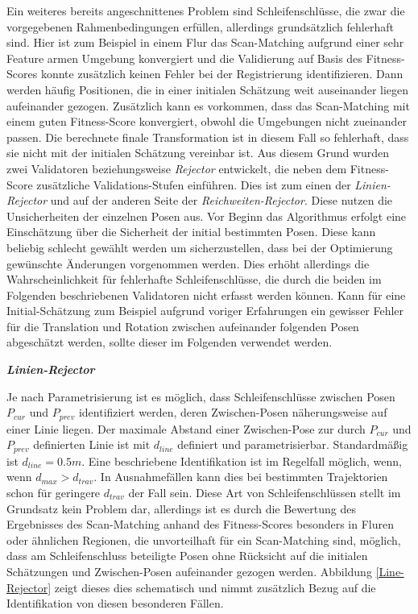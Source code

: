 Ein weiteres bereits angeschnittenes Problem sind Schleifenschlüsse, die zwar die vorgegebenen Rahmenbedingungen erfüllen, allerdings grundsätzlich fehlerhaft sind. Hier ist zum Beispiel in einem Flur das Scan-Matching aufgrund einer sehr Feature armen Umgebung konvergiert und die Validierung auf Basis des Fitness-Scores konnte zusätzlich keinen Fehler bei der Registrierung identifizieren. Dann werden häufig Positionen, die in einer initialen Schätzung weit auseinander liegen aufeinander gezogen. Zusätzlich kann es vorkommen, dass das Scan-Matching mit einem guten Fitness-Score konvergiert, obwohl die Umgebungen nicht zueinander passen. Die berechnete finale Transformation ist in diesem Fall so fehlerhaft, dass sie nicht mit der initialen Schätzung vereinbar ist. Aus diesem Grund wurden zwei Validatoren beziehungsweise \emph{Rejector} entwickelt, die neben dem Fitness-Score zusätzliche Validations-Stufen einführen. Dies ist zum einen der \emph{Linien-Rejector} und auf  der anderen Seite der \emph{Reichweiten-Rejector}. Diese nutzen die Unsicherheiten der einzelnen Posen aus. Vor Beginn das Algorithmus erfolgt eine Einschätzung über die Sicherheit der initial bestimmten Posen. Diese kann beliebig schlecht gewählt werden um sicherzustellen, dass bei der Optimierung gewünschte Änderungen vorgenommen werden. Dies erhöht allerdings die Wahrscheinlichkeit für fehlerhafte Schleifenschlüsse, die durch die beiden im Folgenden beschriebenen Validatoren nicht erfasst werden können. Kann für eine Initial-Schätzung zum Beispiel aufgrund voriger Erfahrungen ein gewisser Fehler für die Translation und Rotation zwischen aufeinander folgenden Posen abgeschätzt werden, sollte dieser im Folgenden verwendet werden.

\textbf{\textsl{Linien-Rejector}}

Je nach Parametrisierung ist es möglich, dass Schleifenschlüsse zwischen Posen $P_{cur}$ und $P_{prev}$ identifiziert werden, deren Zwischen-Posen näherungsweise auf einer Linie liegen. Der maximale Abstand einer Zwischen-Pose zur durch $P_{cur}$ und $P_{prev}$ definierten Linie ist mit $d_{line}$ definiert und parametrisierbar. Standardmäßig ist $d_{line} = 0.5m$. Eine beschriebene Identifikation ist im Regelfall möglich, wenn, wenn $d_{max} > d_{trav}$. In Ausnahmefällen kann dies bei bestimmten Trajektorien schon für geringere $d_{trav}$ der Fall sein. Diese Art von Schleifenschlüssen stellt im Grundsatz kein Problem dar, allerdings ist es durch die Bewertung des Ergebnisses des Scan-Matching anhand des Fitness-Scores besonders in Fluren oder ähnlichen Regionen, die unvorteilhaft für ein Scan-Matching sind, möglich, dass am Schleifenschluss beteiligte Posen ohne Rücksicht auf die initialen Schätzungen und Zwischen-Posen aufeinander gezogen werden. Abbildung \ref{Line-Rejector} zeigt dieses dies schematisch und nimmt zusätzlich Bezug auf die Identifikation von diesen besonderen Fällen.

